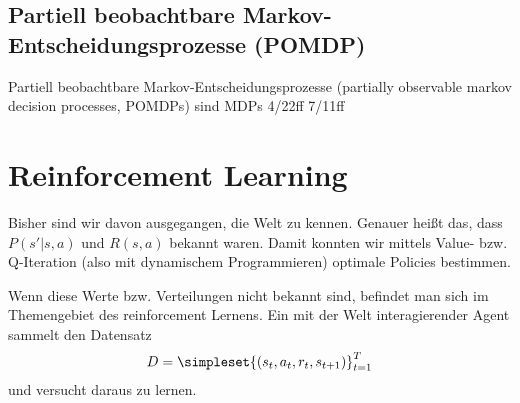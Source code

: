 \documentclass[ngerman]{../LaTeX-Templates/Paper/paper}
\begin{document}








\subsection{Partiell beobachtbare Markov-Entscheidungsprozesse (POMDP)}
Partiell beobachtbare Markov-Entscheidungsprozesse (partially observable markov decision processes, POMDPs) sind MDPs
4/22ff
7/11ff


















\section{Reinforcement Learning}
Bisher sind wir davon ausgegangen, die Welt zu kennen. Genauer heißt das, dass $P(s'|s,a)$ und $R(s,a)$ bekannt waren. Damit konnten wir mittels Value- bzw. Q-Iteration (also mit dynamischem Programmieren) optimale Policies bestimmen.

Wenn diese Werte bzw. Verteilungen nicht bekannt sind, befindet man sich im Themengebiet des reinforcement Lernens.
Ein mit der Welt interagierender Agent sammelt den Datensatz
\begin{equation*}
	D=\simpleset{(s_t,a_t,r_t,s_{t+1})}_{t=1}^T
\end{equation*}
und versucht daraus zu lernen.
\end{document}
